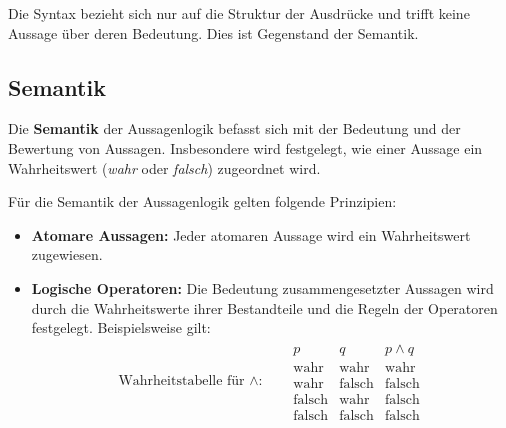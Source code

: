 \documentclass{book}
\theoremstyle{plain}
\theoremstyle{remark}
\theoremstyle{definition}
\begin{document}
Die Syntax bezieht sich nur auf die Struktur der Ausdrücke und trifft keine Aussage über deren Bedeutung. Dies ist Gegenstand der Semantik.

\subsection{Semantik}

Die \textbf{Semantik} der Aussagenlogik befasst sich mit der Bedeutung und der Bewertung von Aussagen. Insbesondere wird festgelegt, wie einer Aussage ein Wahrheitswert (\textit{wahr} oder \textit{falsch}) zugeordnet wird.

Für die Semantik der Aussagenlogik gelten folgende Prinzipien:
\begin{itemize}
    \item \textbf{Atomare Aussagen:} Jeder atomaren Aussage wird ein Wahrheitswert zugewiesen.
    \item \textbf{Logische Operatoren:} Die Bedeutung zusammengesetzter Aussagen wird durch die Wahrheitswerte ihrer Bestandteile und die Regeln der Operatoren festgelegt. Beispielsweise gilt:
    \begin{align*}
        \text{Wahrheitstabelle für \(\land\):} & \quad 
        \begin{array}{c|c|c}
            p & q & p \land q \\
            \hline
            \text{wahr} & \text{wahr} & \text{wahr} \\
            \text{wahr} & \text{falsch} & \text{falsch} \\
            \text{falsch} & \text{wahr} & \text{falsch} \\
            \text{falsch} & \text{falsch} & \text{falsch}
        \end{array}
    \end{align*}
\end{itemize}
\end{document}
